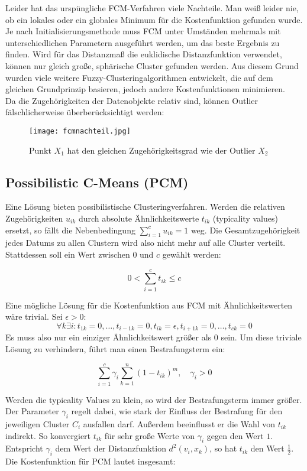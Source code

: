 \documentclass[11pt,ceqn]{book}
\begin{document}
Leider hat das urspüngliche FCM-Verfahren viele Nachteile. Man weiß leider nie, ob ein lokales oder ein globales Minimum für die Kostenfunktion gefunden wurde. Je nach Initialisierungsmethode muss FCM unter Umständen mehrmals mit unterschiedlichen Parametern ausgeführt werden, um das beste Ergebnis zu finden. Wird für das Distanzmaß die euklidische Distanzfunktion verwendet, können nur gleich große, sphärische Cluster gefunden werden. Aus diesem Grund wurden viele weitere Fuzzy-Clusteringalgorithmen entwickelt, die auf dem gleichen Grundprinzip basieren, jedoch andere Kostenfunktionen minimieren.
\\
Da die Zugehörigkeiten der Datenobjekte relativ sind, können Outlier fälschlicherweise überberücksichtigt werden:

\begin{figure}[H]
\centering
\texttt{[image: fcmnachteil.jpg]}
 \caption{Punkt $X_1$ hat den gleichen Zugehörigkeitsgrad wie der Outlier $X_2$}
\end{figure}

\subsection{Possibilistic C-Means (PCM)}
Eine Lösung bieten possibilistische Clusteringverfahren. Werden die relativen Zugehörigkeiten $u_{ik}$ durch absolute Ähnlichkeitswerte $t_{ik}$ (typicality values) ersetzt, so fällt die Nebenbedingung $\sum\limits_{i=1}^c u_{ik} = 1$ weg. Die Gesamtzugehörigkeit jedes Datums zu allen Clustern wird also nicht mehr auf alle Cluster verteilt. Stattdessen soll ein Wert zwischen $0$ und $c$ gewählt werden:

$$0 < \sum_{i=1}^c t_{ik} \leqslant c$$

Eine mögliche Lösung für die Kostenfunktion aus FCM mit Ähnlichkeitswerten wäre trivial. Sei $\epsilon>0$: 
$$\forall k \exists i: t_{1k}=0, \dots, t_{i-1k}=0, t_{ik} = \epsilon, t_{i+1k}=0, \dots, t_{ck}=0 $$
Es muss also nur ein einziger Ähnlichkeitswert größer als $0$ sein. Um diese triviale Lösung zu verhindern, führt man einen Bestrafungsterm ein:

$$\sum_{i=1}^c  \gamma_i \sum_{k=1}^n (1-t_{ik})^m, \quad \gamma_i >0$$

Werden die typicality Values zu klein, so wird der Bestrafungsterm immer größer. Der Parameter $\gamma_i$ regelt dabei, wie stark der Einfluss der Bestrafung für den jeweiligen Cluster $C_i$ ausfallen darf. Außerdem beeinflusst er die Wahl von $t_{ik}$ indirekt. So konvergiert $t_{ik}$ für sehr große Werte von $\gamma_i$ gegen den Wert $1$. Entspricht $\gamma_i$ dem Wert der Distanzfunktion $d^2 (v_i,x_k)$, so hat $t_{ik}$ den Wert $\frac{1}{2}$.
\\
Die Kostenfunktion für PCM lautet insgesamt:
\end{document}
